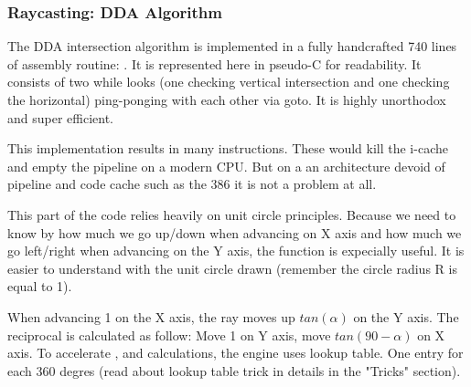  
 
 
 
 
 
\subsubsection{Raycasting: DDA Algorithm}
The DDA intersection algorithm is implemented in a fully handcrafted 740 lines of assembly routine: . It is represented here in pseudo-C for readability. It consists of two while looks (one checking vertical intersection and one checking the horizontal) ping-ponging with each other via goto. It is highly unorthodox and super efficient.\\
\par



\begin{minipage}{\textwidth}

\end{minipage}
This implementation results in many  instructions. These would kill the i-cache and empty the pipeline on a modern CPU. But on a an architecture devoid of pipeline and code cache such as the 386 it is not a problem at all.\\
\par
This part of the code relies heavily on unit circle principles. Because we need to know by how much we go up/down when advancing on X axis and how much we go left/right when advancing on the Y axis, the  function is expecially useful. It is easier to understand with the unit circle drawn (remember the circle radius R is equal to 1).
\begin{figure}[H]
\centering
 
\end{figure}
\par
When advancing 1 on the X axis, the ray moves up $tan(\alpha)$ on the Y axis. The reciprocal is calculated as follow: Move 1 on Y axis, move $tan(90-\alpha)$ on X axis. To accelerate ,  and  calculations, the engine uses lookup table. One entry for each 360 degres (read about lookup table trick in details in the "Tricks" section).




















